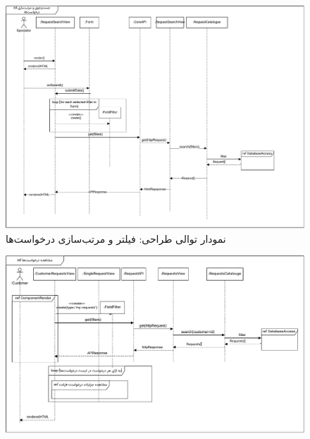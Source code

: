 \begin{figure}[ht!]
	\centering
	\includegraphics[scale=0.8]{figs/design-sequence/3-9.pdf}
	\caption{نمودار توالی طراحی: فیلتر و مرتب‌سازی درخواست‌ها}
\end{figure}
\FloatBarrier
\newpage

\eject \pdfpagewidth=9in \pdfpageheight=7in

\begin{figure}[ht!]
	\centering
	\includegraphics[scale=0.8]{figs/design-sequence/3-10.pdf}
\end{figure}
\FloatBarrier
\newpage

\eject \pdfpagewidth=10in \pdfpageheight=10in

